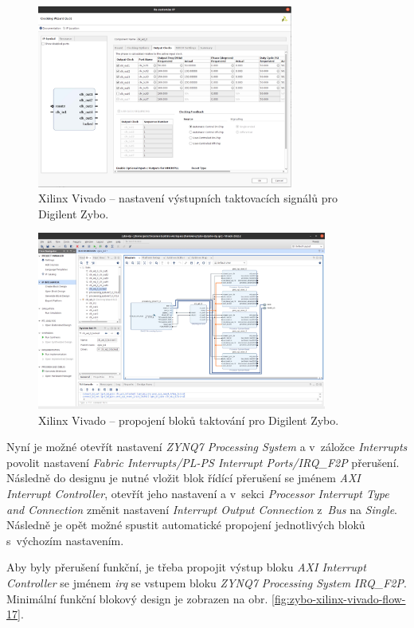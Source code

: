 \documentclass[a4paper, twoside, 11pt]{article}
\newcommand{\fbar}{\FloatBarrier}
\begin{document}
\begin{appendices}
		\begin{figure}[htbp!]
			\centering
			\includegraphics[width=0.75\textwidth]{src/png/zybo-xilinx-vivado-flow/zybo-xilinx-vivado-flow-36.jpg}
			\caption{Xilinx Vivado – nastavení výstupních taktovacích signálů pro Digilent Zybo.}
			\label{fig:zybo-xilinx-vivado-flow-36}
		\end{figure}

		\begin{figure}[htbp!]
			\centering
			\includegraphics[width=0.85\textwidth]{src/png/zybo-xilinx-vivado-flow/zybo-xilinx-vivado-flow-12.jpg}
			\caption{Xilinx Vivado – propojení bloků taktování pro Digilent Zybo.}
			\label{fig:zybo-xilinx-vivado-flow-12}
		\end{figure}

		\fbar

		Nyní je možné otevřít nastavení \textit{ZYNQ7 Processing System} a v~záložce \textit{Interrupts} povolit nastavení \textit{Fabric Interrupts/PL-PS Interrupt Ports/IRQ\_F2P} přerušení. Následně do designu je nutné vložit blok řídící přerušení se jménem \textit{AXI Interrupt Controller}, otevřít jeho nastavení a v~sekci \textit{Processor Interrupt Type and Connection} změnit nastavení \textit{Interrupt Output Connection} z~\textit{Bus} na \textit{Single}. Následně je opět možné spustit automatické propojení jednotlivých bloků s~výchozím nastavením.\par
		Aby byly přerušení funkční, je třeba propojit výstup bloku \textit{AXI Interrupt Controller} se jménem \textit{irq} se vstupem bloku \textit{ZYNQ7 Processing System} \textit{IRQ\_F2P}. Minimální funkční blokový design je zobrazen na obr. \ref{fig:zybo-xilinx-vivado-flow-17}.


\end{appendices}
\end{document}
